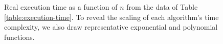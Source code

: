 \begin{figure}[htpb]
\centering
{}
\caption{Real execution time as a function of $n$ from the data of Table \ref{table:execution-time}. To reveal the scaling of each algorithm's time complexity, we also draw representative exponential and polynomial functions.}
\label{fig:execution-time}
\end{figure} %